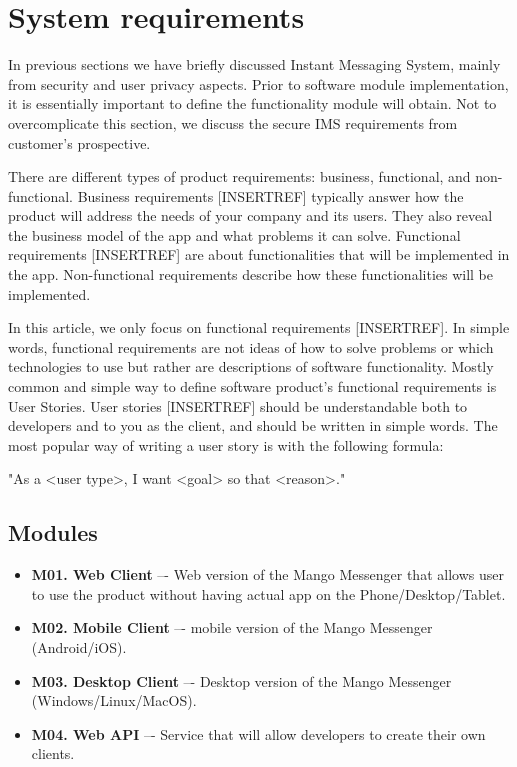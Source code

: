 \chapter{System requirements}\label{ch:system-requirements}

In previous sections we have briefly discussed Instant Messaging System, mainly from security and user privacy aspects.
Prior to software module implementation, it is essentially important to define the functionality module will obtain.
Not to overcomplicate this section, we discuss the secure IMS requirements from customer's prospective.

There are different types of product requirements: business, functional, and non-functional.
Business requirements [INSERTREF] typically answer how the product will address the needs of your company and its users.
They also reveal the business model of the app and what problems it can solve.
Functional requirements [INSERTREF] are about functionalities that will be implemented in the app.
Non-functional requirements describe how these functionalities will be implemented.

In this article, we only focus on functional requirements [INSERTREF].
In simple words, functional requirements are not ideas of how to solve problems or which technologies to use but rather
are descriptions of software functionality.
Mostly common and simple way to define software product's functional requirements is User Stories.
User stories [INSERTREF] should be understandable both to developers and to you as the client, and should be written in simple words.
The most popular way of writing a user story is with the following formula:

\begin{center}
    "As a <user type>, I want <goal> so that <reason>."
\end{center}


\section{Modules}\label{sec:modules}
\begin{itemize}
    \item \textbf{M01. Web Client} –- Web version of the Mango Messenger that allows user to use the
    product without having actual app on the Phone/Desktop/Tablet.
    \item \textbf{M02. Mobile Client} –- mobile version of the Mango Messenger (Android/iOS).
    \item \textbf{M03. Desktop Client} –- Desktop version of the Mango Messenger (Windows/Linux/MacOS).
    \item \textbf{M04. Web API} –- Service that will allow developers to create their own clients.
\end{itemize}

